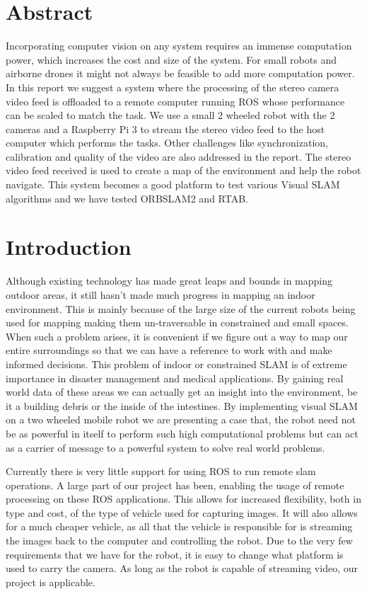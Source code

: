 \documentclass[10pt]{article}
\begin{document}
\section{Abstract}
	Incorporating computer vision on any system requires an immense computation power, which increases the cost and size of the system. For small robots and airborne drones it might not always be feasible to add more computation power. In this report we suggest a system where the processing of the stereo camera video feed is offloaded to a remote computer running ROS whose performance can be scaled to match the task. We use a small 2 wheeled robot with the 2 cameras and a Raspberry Pi 3 to stream the stereo video feed to the host computer which performs the tasks. Other challenges like synchronization, calibration and quality of the video are also addressed in the report. The stereo video feed received is used to create a map of the environment and help the robot navigate. This system becomes a good platform to test various Visual SLAM algorithms and we have tested ORBSLAM2 and RTAB.



\section{Introduction}
Although existing technology has made great leaps and bounds in mapping outdoor areas, it still hasn't made much progress in mapping an indoor environment. This is mainly because of the large size of the current robots being used for mapping making them un-traversable in constrained and small spaces. When such a problem arises, it is convenient if we figure out a way to map our entire surroundings so that we can have a reference to work with and make informed decisions. This problem of indoor or constrained SLAM is of extreme importance in disaster management and medical applications. By gaining real world data of these areas we can actually get an insight into the environment, be it a building debris or the inside of the intestines. By implementing visual SLAM on a two wheeled mobile robot we are presenting a case that, the robot need not be as powerful in itself to perform such high computational problems but can act as a carrier of message to a powerful system to solve real world problems.

	Currently there is very little support for using ROS to run remote slam operations. A large part of our project has been, enabling the usage of remote processing on these ROS applications. This allows for increased flexibility, both in type and cost, of the type of vehicle used for capturing images. It will also allows for a much cheaper vehicle, as all that the vehicle is responsible for is streaming the images back to the computer and controlling the robot. Due to the very few requirements that we have for the robot, it is easy to change what platform is used to carry the camera. As long as the robot is capable of streaming video, our project is applicable.
\end{document}
